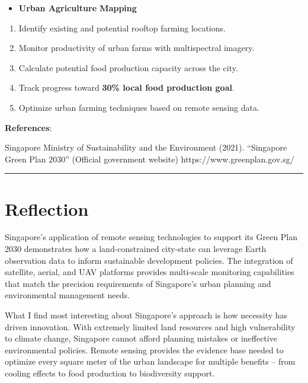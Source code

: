 \documentclass[
  letterpaper,
  DIV=11,
  numbers=noendperiod]{scrreprt}
\providecommand{\tightlist}{%
  \setlength{\itemsep}{0pt}\setlength{\parskip}{0pt}}\usepackage{longtable,booktabs,array}
\begin{document}
\begin{itemize}
\tightlist
\item
  \textbf{Urban Agriculture Mapping}
\end{itemize}

\begin{enumerate}
\def\labelenumi{\arabic{enumi}.}
\tightlist
\item
  Identify existing and potential rooftop farming locations.
\item
  Monitor productivity of urban farms with multispectral imagery.
\item
  Calculate potential food production capacity across the city.
\item
  Track progress toward \textbf{30\% local food production goal}.
\item
  Optimize urban farming techniques based on remote sensing data.
\end{enumerate}

\textbf{References}:

Singapore Ministry of Sustainability and the Environment (2021).
``Singapore Green Plan 2030'' (Official government website)
https://www.greenplan.gov.sg/

\begin{center}\rule{0.5\linewidth}{0.5pt}\end{center}

\section{Reflection}\label{reflection-2}

Singapore's application of remote sensing technologies to support its
Green Plan 2030 demonstrates how a land-constrained city-state can
leverage Earth observation data to inform sustainable development
policies. The integration of satellite, aerial, and UAV platforms
provides multi-scale monitoring capabilities that match the precision
requirements of Singapore's urban planning and environmental management
needs.

What I find most interesting about Singapore's approach is how necessity
has driven innovation. With extremely limited land resources and high
vulnerability to climate change, Singapore cannot afford planning
mistakes or ineffective environmental policies. Remote sensing provides
the evidence base needed to optimize every square meter of the urban
landscape for multiple benefits -- from cooling effects to food
production to biodiversity support.
\end{document}
